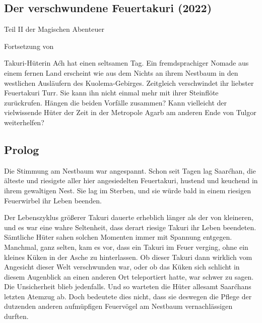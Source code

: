 \begin{chapterbox}
    \chapter{Der verschwundene Feuertakuri (2022)}
    \label{Der verschwundene Feuertakuri (2022)}

    \begin{center}
        Teil II der Magischen Abenteuer
        
        Fortsetzung von 
    \end{center}
    
    Takuri-Hüterin Aćh hat einen seltsamen Tag. Ein fremdsprachiger Nomade aus einem fernen Land erscheint wie aus dem Nichts an ihrem Nestbaum in den westlichen Ausläufern des Kuolema-Gebirges. Zeitgleich verschwindet ihr liebster Feuertakuri Turr. Sie kann ihn nicht einmal mehr mit ihrer Steinflöte zurückrufen. Hängen die beiden Vorfälle zusammen? Kann vielleicht der vielwissende Hüter der Zeit in der Metropole Agarb am anderen Ende von Tulgor weiterhelfen?
\end{chapterbox}


\section{Prolog}


Die Stimmung am Nestbaum war angespannt. Schon seit Tagen lag Saarćhan, die älteste und riesigste aller hier angesiedelten Feuertakuri, hustend und keuchend in ihrem gewaltigen Nest. Sie lag im Sterben, und sie würde bald in einem riesigen Feuerwirbel ihr Leben beenden.

Der Lebenszyklus größerer Takuri dauerte erheblich länger als der von kleineren, und es war eine wahre Seltenheit, dass derart riesige Takuri ihr Leben beendeten. Sämtliche Hüter sahen solchen Momenten immer mit Spannung entgegen. Manchmal, ganz selten, kam es vor, dass ein Takuri im Feuer verging, ohne ein kleines Küken in der Asche zu hinterlassen. Ob dieser Takuri dann wirklich vom Angesicht dieser Welt verschwunden war, oder ob das Küken sich schlicht in diesem Augenblick an einen anderen Ort teleportiert hatte, war schwer zu sagen. Die Unsicherheit blieb jedenfalls. Und so warteten die Hüter allesamt Saarćhans letzten Atemzug ab. Doch bedeutete dies nicht, dass sie deswegen die Pflege der dutzenden anderen aufmüpfigen Feuervögel am Nestbaum vernachlässigen durften.

